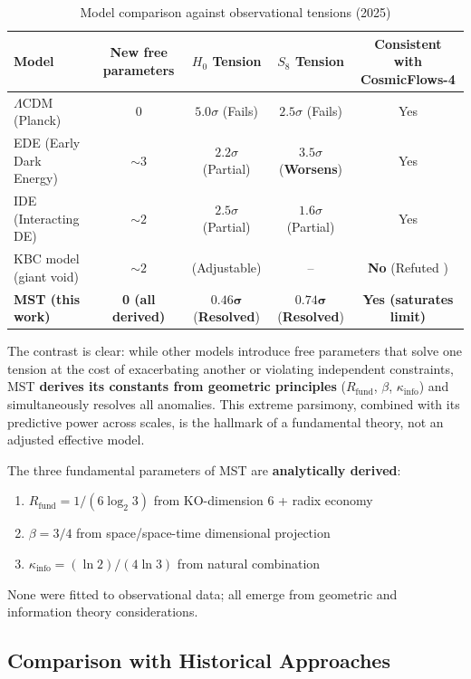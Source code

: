 \documentclass[11pt, a4paper]{article}
\theoremstyle{plain}
\theoremstyle{definition}
\newcommand{\Rfactor}{R_{\text{fund}}}
\newcommand{\Kinfo}{\kappa_{\text{info}}}
\begin{document}
\begin{table}[H]
\centering
\caption{Model comparison against observational tensions (2025)}
\label{tab:complete_comparison}
\small
\begin{tabular}{lcccc}
\toprule
\textbf{Model} & \textbf{New free parameters} & \textbf{$H_0$ Tension} & \textbf{$S_8$ Tension} & \textbf{Consistent with CosmicFlows-4} \\
\midrule
$\Lambda$CDM (Planck) & 0 & $5.0\sigma$ (Fails) & $2.5\sigma$ (Fails) & Yes \\
\addlinespace
EDE (Early Dark Energy) & $\sim 3$ & $2.2\sigma$ (Partial) & $3.5\sigma$ (\textbf{Worsens}) & Yes \\
IDE (Interacting DE) & $\sim 2$ & $2.5\sigma$ (Partial) & $1.6\sigma$ (Partial) & Yes \\
KBC model (giant void) & $\sim 2$ & (Adjustable) & -- & \textbf{No} (Refuted \cite{Mazurenko2024}) \\
\rowcolor{blue!10}
\textbf{MST (this work)} & \textbf{0 (all derived)} & $\mathbf{0.46\sigma}$ (\textbf{Resolved}) & $\mathbf{0.74\sigma}$ (\textbf{Resolved}) & \textbf{Yes (saturates limit)} \\
\bottomrule
\end{tabular}
\end{table}

The contrast is clear: while other models introduce free parameters that solve one tension at the cost of exacerbating another or violating independent constraints, MST \textbf{derives its constants from geometric principles} ($\Rfactor$, $\beta$, $\Kinfo$) and simultaneously resolves all anomalies. This extreme parsimony, combined with its predictive power across scales, is the hallmark of a fundamental theory, not an adjusted effective model.

The three fundamental parameters of MST are \textbf{analytically derived}:
\begin{enumerate}
    \item $\Rfactor = 1/(6\log_2 3)$ from KO-dimension 6 + radix economy
    \item $\beta = 3/4$ from space/space-time dimensional projection
    \item $\Kinfo = (\ln 2)/(4\ln 3)$ from natural combination
\end{enumerate}

None were fitted to observational data; all emerge from geometric and information theory considerations.

\subsection{Comparison with Historical Approaches}
\end{document}
